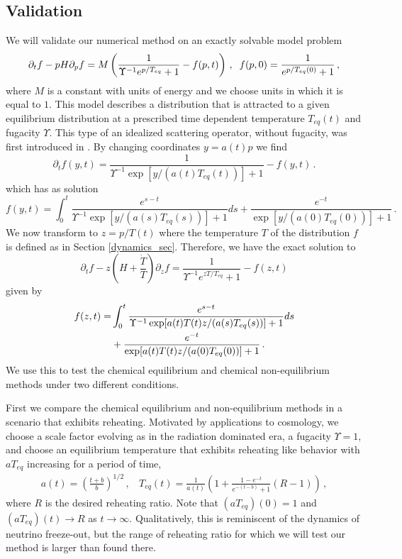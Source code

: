 \subsection{Validation}\label{validation}
We will validate our numerical method on an exactly solvable model problem
\begin{equation}\label{toy_eq}
\partial_t f-pH \partial_p f=M\left(\frac{1}{\Upsilon^{-1}e^{p/T_{eq}}+1}-f(p,t)\right)\,, \hspace{2mm} f(p,0)=\frac{1}{e^{p/T_{eq}(0)}+1}\,,
\end{equation}
where $M$ is a constant with units of energy and we choose units in which it is equal to $1$. This model describes a distribution that is attracted to a given equilibrium distribution at a prescribed time dependent temperature $T_{eq}(t)$ and fugacity $\Upsilon$. This type of an idealized scattering operator, without fugacity, was first introduced in \cite{Anderson:1974nyl}. By changing coordinates $y=a(t)p$ we find
\begin{equation}\label{free_stream_toy}
\partial_tf(y,t)=\frac{1}{\Upsilon^{-1}\exp[y/(a(t)T_{eq}(t))]+1}-f(y,t)\,.
\end{equation}
 which has as solution
\begin{equation}\label{exact_sol}
f(y,t)=\int_0^t\frac{e^{s-t}}{\Upsilon^{-1}\exp[y/(a(s)T_{eq}(s))]+1}ds+\frac{e^{-t}}{\exp[y/(a(0)T_{eq}(0))]+1}\,.
\end{equation}
We now transform to $z=p/T(t)$ where the temperature $T$ of the distribution $f$ is defined as in Section \ref{dynamics_sec}.  Therefore, we have the exact solution to
\begin{equation}\label{k_eq_toy}
\partial_tf-z\left(H+\frac{\dot{T}}{T}\right)\partial_zf=\frac{1}{\Upsilon^{-1}e^{zT/T_{eq}}+1}-f(z,t)
\end{equation}
given by
\begin{align}
f(z,t)=&\int_0^t\frac{e^{s-t}}{\Upsilon^{-1}\exp[a(t)T(t)z/(a(s)T_{eq}(s))]+1}ds\\
&+\frac{e^{-t}}{\exp[a(t)T(t)z/(a(0)T_{eq}(0))]+1}\,.\notag
\end{align}
We use this to test the chemical equilibrium and chemical non-equilibrium methods under two different conditions. 

First we compare the chemical equilibrium and non-equilibrium methods in a scenario that exhibits reheating.  Motivated by applications to cosmology, we choose a scale factor evolving as in the radiation dominated era, a fugacity $\Upsilon=1$, and choose an equilibrium temperature that exhibits reheating like behavior with $aT_{eq}$ increasing for a period of time,
\begin{align}\label{a_T_def}
a(t)=\left(\frac{t+b}{b}\right)^{1/2}\,,\ \  \ \
T_{eq}(t)=\frac{1}{a(t)}\left(1+\frac{1-e^{-t}}{e^{-(t-b)}+1}(R-1)\right)\,,
\end{align}
where $R$ is the desired reheating ratio. Note that $(aT_{eq})(0)=1$ and $(aT_{eq})(t)\rightarrow R$ as $t\rightarrow\infty$. Qualitatively, this is reminiscent of the dynamics of neutrino freeze-out, but the range of reheating ratio for which we will test our method is larger than found there.

